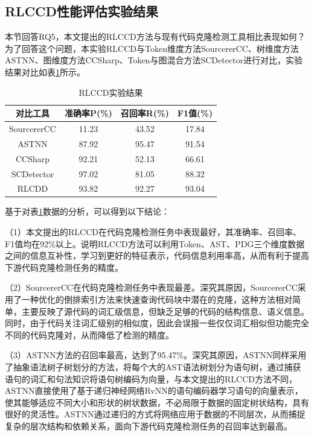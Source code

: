 \subsection{RLCCD性能评估实验结果}

本节回答RQ5，本文提出的RLCCD方法与现有代码克隆检测工具相比表现如何？为了回答这个问题，本实验RLCCD与Token维度方法SourcererCC、树维度方法ASTNN、图维度方法CCSharp、Token与图混合方法SCDetector进行对比，实验结果对比如表\ref{tab:RLCCD}所示。

\begin{table}[htp]
  \centering
  \caption{RLCCD实验结果}
  \label{tab:RLCCD}
  \begin{tabular*}{0.9\textwidth}{@{\extracolsep{\fill}}cccc}
  \toprule
    对比工具		& 准确率P(\%) & 召回率R(\%) & F1值(\%)  \\ 
  \midrule
    SourcererCC		& 11.23	  & 43.52		& 17.84 \\
    ASTNN			    & 87.92		& 95.47		& 91.54 \\
    CCSharp			  & 92.21	  & 52.13	  & 66.61 \\
    SCDetector		& 97.02	  & 81.05		& 88.32 \\
    RLCDD			    & 93.82		& 92.27		& 93.04  \\
  \bottomrule
  \end{tabular*}
\end{table}


基于对表\ref{tab:RLCCD}数据的分析，可以得到以下结论：

（1）本文提出的RLCCD在代码克隆检测任务中表现最好，其准确率、召回率、F1值均在92\%以上。说明RLCCD方法可以利用Token、AST、PDG三个维度数据之间的信息互补性，学习到更好的特征表示，代码信息利用率高，从而有利于提高下游代码克隆检测任务的精度。

（2）SourcererCC在代码克隆检测任务中表现最差。深究其原因，SourcererCC采用了一种优化的倒排索引方法来快速查询代码块中潜在的克隆，这种方法相对简单，主要反映了源代码的词汇级信息，但缺乏足够的代码的结构信息、语义信息。同时，由于代码关注词汇级别的相似度，因此会误报一些仅仅词汇相似但功能完全不同的代码克隆对，从而降低了检测的精度。

（3）ASTNN方法的召回率最高，达到了95.47\%。深究其原因，ASTNN同样采用了抽象语法树子树划分的方法，将每个大的AST语法树划分为语句树，通过捕获语句的词汇和句法知识将语句树编码为向量，与本文提出的RLCCD方法不同，ASTNN直接使用了基于递归神经网络RvNN的语句编码器学习语句的向量表示，使其能够适应不同大小和形状的树状数据，不必局限于数据的固定树状结构，具有很好的灵活性。ASTNN通过递归的方式将网络应用于数据的不同层次，从而捕捉复杂的层次结构和依赖关系，面向下游代码克隆检测任务的召回率达到最高。


